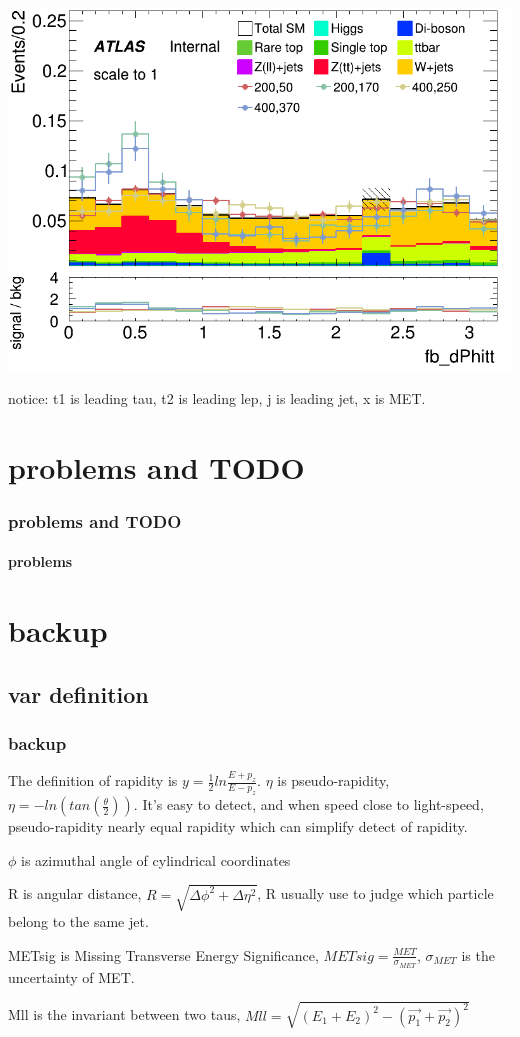 \documentclass[usenames,dvipsnames]{beamer}
\begin{document}
\begin{frame}
\begin{minipage}{0.32\textwidth}
        \includegraphics[width=\textwidth]{graphics/LH_met_sig/LH_fb_dPhitt_norm.png}
    \end{minipage}
    notice: t1 is leading tau, t2 is leading lep, j is leading jet, x is MET.
\end{frame}

\section{problems and TODO}
\begin{frame}
	\frametitle{problems and TODO}
	\framesubtitle{problems}
\end{frame}


\section{backup}
\subsection{var definition}
\begin{frame}
	\frametitle{backup}
	The definition of rapidity is $y = \frac{1}{2}ln\frac{E+p_z}{E-p_z}$. $\eta$ is pseudo-rapidity, $\eta = -ln(tan(\frac{\theta}{2})).$ It's easy to detect, and when speed close to light-speed, pseudo-rapidity nearly equal rapidity which can simplify detect of rapidity.
	
	$\phi$ is azimuthal angle of cylindrical coordinates
	
	R is angular distance, $R = \sqrt{\Delta\phi^2+\Delta\eta^2}$, R usually use to judge which particle belong to the same jet.
	
	METsig is Missing Transverse Energy Significance, $METsig = \frac{MET}{\sigma_{MET}}$, $\sigma_{MET}$ is the uncertainty of MET.
	
	Mll is the invariant between two taus, $Mll = \sqrt{(E_1 + E_2)^2 - (\vec{p_1}+\vec{p_2})^2}$
\end{frame}
\end{document}
